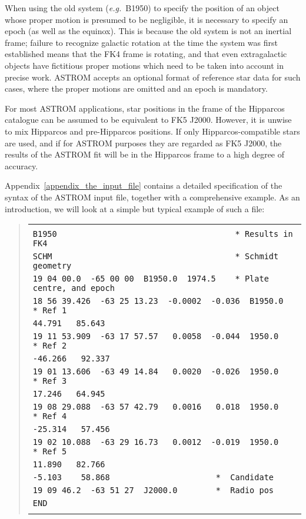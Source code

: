 \documentclass[twoside,11pt]{article}
\renewcommand{\_}{\texttt{\symbol{95}}}
\begin{document}
When using the old system (\emph{e.g.}\ B1950) to specify the position
of an object whose proper motion is presumed to be negligible, it is
necessary to specify an epoch (as well as the equinox).  This is because
the old system is not an inertial frame; failure to recognize galactic
rotation at the time the system was first established means that the FK4
frame is rotating, and that even extragalactic objects have fictitious
proper motions which need to be taken into account in precise work.
ASTROM accepts an optional format of reference star data for such cases,
where the proper motions are omitted and an epoch is mandatory.

For most ASTROM applications, star positions in the frame of the
Hipparcos catalogue can be assumed to be equivalent to FK5 J2000.
However, it is unwise to mix Hipparcos and pre-Hipparcos positions.  If
only Hipparcos-compatible stars are used, and if for ASTROM purposes
they are regarded as FK5 J2000, the results of the ASTROM fit will be
in the Hipparcos frame to a high degree of accuracy.

Appendix~\ref{appendix_the_input_file} contains a detailed specification
of the syntax of the ASTROM input file, together with a comprehensive
example.  As an introduction, we will look at a simple but typical
example of such a file:

\begin{quote}
\begin{small}
\begin{tabular}{|l|}
\hline
\\
\verb|B1950                                     * Results in FK4| \\
\verb|SCHM                                      * Schmidt geometry| \\
\verb|19 04 00.0  -65 00 00  B1950.0  1974.5    * Plate centre, and epoch| \\
\verb|18 56 39.426  -63 25 13.23  -0.0002  -0.036  B1950.0  * Ref 1| \\
\verb|44.791   85.643| \\
\verb|19 11 53.909  -63 17 57.57   0.0058  -0.044  1950.0   * Ref 2| \\
\verb|-46.266   92.337| \\
\verb|19 01 13.606  -63 49 14.84   0.0020  -0.026  1950.0   * Ref 3| \\
\verb|17.246   64.945| \\
\verb|19 08 29.088  -63 57 42.79   0.0016   0.018  1950.0   * Ref 4| \\
\verb|-25.314   57.456| \\
\verb|19 02 10.088  -63 29 16.73   0.0012  -0.019  1950.0   * Ref 5| \\
\verb|11.890   82.766| \\
\verb|-5.103    58.868                      *  Candidate| \\
\verb|19 09 46.2  -63 51 27  J2000.0        *  Radio pos| \\
\verb|END| \\
\\
\hline
\end{tabular}
\end{small}
\end{quote}
\end{document}
